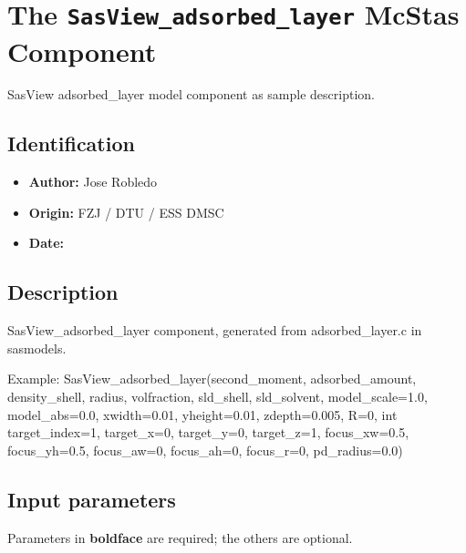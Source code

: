 \section{The \texttt{SasView\_adsorbed\_layer} McStas Component}
SasView adsorbed\_layer model component as sample description.

\subsection*{Identification}
\begin{itemize}
  \item \textbf{Author:} Jose Robledo
  \item \textbf{Origin:} FZJ / DTU / ESS DMSC
  \item \textbf{Date:} 
\end{itemize}

\subsection*{Description}
SasView\_adsorbed\_layer component, generated from adsorbed\_layer.c in sasmodels.

Example: SasView\_adsorbed\_layer(second\_moment, adsorbed\_amount, density\_shell, radius, volfraction, sld\_shell, sld\_solvent, model\_scale=1.0, model\_abs=0.0, xwidth=0.01, yheight=0.01, zdepth=0.005, R=0, int target\_index=1, target\_x=0, target\_y=0, target\_z=1, focus\_xw=0.5, focus\_yh=0.5, focus\_aw=0, focus\_ah=0, focus\_r=0, pd\_radius=0.0)

\subsection*{Input parameters}
Parameters in \textbf{boldface} are required; the others are optional.

